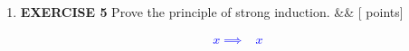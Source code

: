 \documentclass[12pt]{article}
\newcommand{\points}[1]{\hfill {[#1 points]}}
\newcommand{\problem}[2][]{%
  \item {#2}%
  \ifx&#1&%
  \else%
    \points{#1}%
  \fi
  \par\vspace{0.5em}
}
\begin{document}
\begin{enumerate}[leftmargin=*, label=\textbf{\arabic*.}]
\begin{enumerate}
	\problem{If $a > b$, then $a\text{++} > b$}	
	\textcolor{blue}{
	\begin{align*}
	a > b \implies& a\text{++} > a > b \;\; \text{(definition of successor)}\\
	\implies& a\text{++} > b \;\; \text{(transitivity)}\\
	\end{align*}}
	
	\problem{If $a = b$, then $a\text{++} > b$}	
	\textcolor{blue}{
	\begin{align*}
	a = b \implies& a\text{++} > a = b \;\; \text{(definition of successor)}\\
	\implies& a\text{++} > b\\
	\end{align*}}
	\end{enumerate}
	
	\problem{\textbf{EXERCISE 5} Prove the principle of strong induction.}
	\textcolor{blue}{
	\begin{align*}
	x \implies& x \\
	\end{align*}}
	
\end{enumerate}
\end{document}

